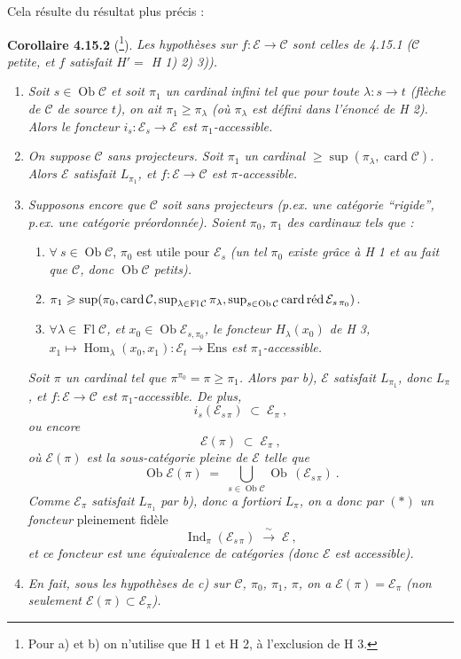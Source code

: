 \documentclass[11pt]{article}
\newcommand{\printedpage}[1]{\marginpar{\footnotesize p.~#1}}
\newcommand{\msp}[1]{\marginpar{\footnotesize [#1]}}
\newcommand{\Ob}{\operatorname{Ob}}
\newcommand{\card}{\operatorname{card}}
\DeclareMathOperator{\Ind}{Ind}
\newcommand{\cardred}{\mathop{\textup{card\,réd}}\nolimits}
\newcommand{\Fl}{\operatorname{Fl}}
\newcommand{\Hom}{\operatorname{Hom}}
\newcommand{\Ens}{\mathrm{Ens}}
\newcommand{\cE}{\mathcal{E}}
\newcommand{\cC}{\mathcal{C}}
\begin{document}
Cela résulte du résultat plus précis :

\printedpage{162}

\msp{page 426}
\textbf{Corollaire 4.15.2} (\footnote{Pour a) et b) on n'utilise que H 1 et H 2, à l'exclusion de H 3.}). \textit{Les hypothèses sur $f : \cE \longrightarrow \cC$ sont celles de 4.15.1 ($\cC$ petite, et $f$ satisfait $H' =$ H 1) 2) 3)).}
\begin{enumerate}
\item[\textit{a)}] \textit{Soit $s \in \Ob\cC$ et soit $\pi_1$ un cardinal infini tel que pour toute $\lambda : s \longrightarrow t$ (flèche de $\cC$ de source $t$), on ait $\pi_1 \geqslant \pi_\lambda$ (où $\pi_\lambda$ est défini dans l'énoncé de H 2). Alors le foncteur $i_s : \cE_s \longrightarrow \cE$ est $\pi_1$-accessible.} %
\item[\textit{b)}] \textit{On suppose $\cC$ sans projecteurs. Soit $\pi_1$ un cardinal $\geqslant \sup(\pi_\lambda, \card\cC)$. Alors $\cE$ satisfait $L_{\pi_1}$, et $f : \cE \longrightarrow \cC$ est $\pi$-accessible.}
\item[\textit{c)}] \textit{Supposons encore que $\cC$ soit sans projecteurs (p.ex. une catégorie ``rigide'', p.ex. une catégorie préordonnée). Soient $\pi_0$, $\pi_1$ des cardinaux tels que :}
\begin{enumerate}
\item[\textcircled{\footnotesize $1^o$}] $\forall\ s \in \Ob\cC$, $\pi_0$ est utile pour $\cE_s$ \textit{(un tel $\pi_0$ existe grâce à H 1 et au fait que $\cC$, donc $\Ob\cC$ petits).}
\item[\textcircled{\footnotesize $2^o$}] $\pi_1 \geqslant \sup(\pi_0, \card\cC, \sup_{\lambda\in\Fl\cC}\pi_\lambda, \sup_{s\in\Ob\cC} \cardred \cE_{s\,\pi_0})$.
\item[\textcircled{\footnotesize $3^o$}] \textit{$\forall\lambda \in \Fl\cC$, et $x_0 \in \Ob\cE_{s,\pi_0}$, le foncteur $H_\lambda(x_0)$ de H 3, $x_1 \longmapsto \Hom_\lambda(x_0,x_1) : \cE_t \longrightarrow \Ens$ est $\pi_1$-accessible.}
\end{enumerate}
\textit{Soit $\pi$ un cardinal tel que $\pi^{\pi_0} = \pi \geqslant \pi_1$. Alors par b), $\cE$ satisfait $L_{\pi_1}$, donc $L_\pi$, et $f : \cE \longrightarrow \cC$ est $\pi_1$-accessible. De plus,}
\[
i_s(\cE_{s\,\pi}) \;\subset\; \cE_\pi\ ,
\]
\textit{ou encore}
\[
\cE(\pi) \;\subset\; \cE_\pi\ , \tag*{$(*)$}
\]
\textit{où $\cE(\pi)$ est la sous-catégorie pleine de $\cE$ telle que}
\[
\Ob\cE(\pi) \;=\; \bigcup_{s\in\Ob\cC} \Ob\,(\cE_{s\,\pi})\ .
\]
\textit{Comme $\cE_\pi$ satisfait $L_{\pi_1}$ par b), donc a fortiori $L_\pi$, on a donc par $(*)$ un foncteur} pleinement fidèle
\[
\Ind_\pi(\cE_{s\,\pi}) \;\xrightarrow{\ \sim\ }\; \cE\ ,
\]
\textit{et ce foncteur est une équivalence de catégories (donc $\cE$ est accessible).}
\item[\textit{d)}] \textit{En fait, sous les hypothèses de c) sur $\cC$, $\pi_0$, $\pi_1$, $\pi$, on a $\cE(\pi) = \cE_\pi$ (non seulement $\cE(\pi) \subset \cE_\pi$).}
\end{enumerate}
\end{document}
